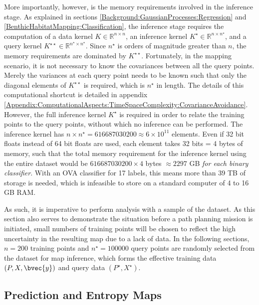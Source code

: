 			More importantly, however, is the memory requirements involved in the inference stage. As explained in sections \ref{Background:GaussianProcesses:Regression} and \ref{BenthicHabitatMapping:Classification}, the inference stage requires the computation of a data kernel $K \in \mathbb{R}^{n \times n}$, an inference kernel $K^{\star} \in \mathbb{R}^{n \times n^{\star}}$, and a query kernel $K^{\star \star} \in \mathbb{R}^{n^{\star} \times n^{\star}}$. Since $n^{\star}$ is orders of magnitude greater than $n$, the memory requirements are dominated by $K^{\star \star}$. Fortunately, in the mapping scenario, it is not necessary to know the covariances between all the query points. Merely the variances at each query point needs to be known such that only the diagonal elements of $K^{\star \star}$ is required, which is $n^{\star}$ in length. The details of this computational shortcut is detailed in appendix \ref{Appendix:ComputationalAspects:TimeSpaceComplexity:CovarianceAvoidance}. However, the full inference kernel $K^{\star}$ is required in order to relate the training points to the query points, without which no inference can be performed. The inference kernel has $n \times n^{\star} = 616687030200 \approx 6 \times 10^{11}$ elements. Even if 32 bit floats instead of 64 bit floats are used, each element takes 32 bits = 4 bytes of memory, such that the total memory requirement for the inference kernel using the entire dataset would be $616687030200 \times 4$ bytes $\approx 2297$ GB \textit{for each binary classifier}. With an OVA classifier for 17 labels, this means more than 39 TB of storage is needed, which is infeasible to store on a standard computer of 4 to 16 GB RAM.
			
			As such, it is imperative to perform analysis with a sample of the dataset. As this section also serves to demonstrate the situation before a path planning mission is initiated, small numbers of training points will be chosen to reflect the high uncertainty in the resulting map due to a lack of data. In the following sections, $n = 200$ training points and $n^{\star} = 100000$ query points are randomly selected from the dataset for map inference, which forms the effective training data $(P, X, \bvec{y})$ and query data $(P^{\star}, X^{\star})$.
			
		\subsection{Prediction and Entropy Maps}
		\label{BenthicHabitatMapping:ScottReef:Maps}
	
